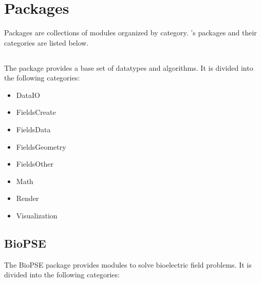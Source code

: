 %
%
%
%
%
%

\chapter{Packages}
\label{ch:packages}

Packages are collections of modules organized by category. \sr{}'s 
packages and their categories are listed below. 

\section{\sr{}}
\label{sec:srpackage}

The \sr{} package provides a base set of datatypes and algorithms.  It
is divided into the following categories:

\begin{itemize}
  \item DataIO
  \item FieldsCreate
  \item FieldsData
  \item FieldsGeometry
  \item FieldsOther
  \item Math
  \item Render
  \item Visualization
\end{itemize}

\section{BioPSE}
\label{sec:biopsepackage}


The BioPSE package provides modules to solve bioelectric field
problems.  It is divided into the following categories:

